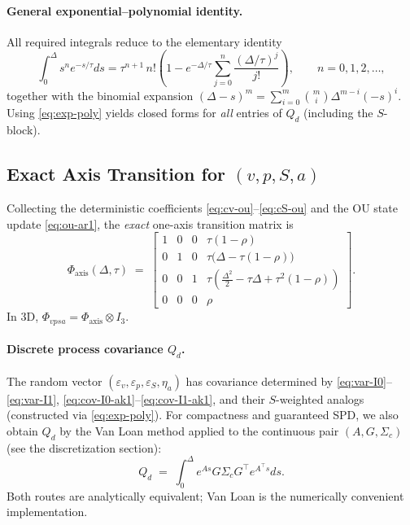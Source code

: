 \documentclass[11pt]{article}
\begin{document}
\paragraph{General exponential--polynomial identity.}
All required integrals reduce to the elementary identity
\begin{equation}
\int_0^\Delta s^n e^{-s/\tau} ds
= \tau^{n+1}\,n!\left(1 - e^{-\Delta/\tau}\sum_{j=0}^{n}\frac{(\Delta/\tau)^j}{j!}\right),
\qquad n=0,1,2,\dots,
\label{eq:exp-poly}
\end{equation}
together with the binomial expansion $(\Delta-s)^m=\sum_{i=0}^m \binom{m}{i}\Delta^{m-i}(-s)^i$.
Using \eqref{eq:exp-poly} yields closed forms for \emph{all} entries of $Q_d$ (including the $S$-block).

\subsection{Exact Axis Transition for $(v,p,S,a)$}
Collecting the deterministic coefficients \eqref{eq:cv-ou}--\eqref{eq:cS-ou} and the OU state update \eqref{eq:ou-ar1},
the \emph{exact} one-axis transition matrix is
\begin{equation}
\Phi_{\text{axis}}(\Delta,\tau) \;=\;
\begin{bmatrix}
1 & 0 & 0 & \tau(1-\rho)\\
0 & 1 & 0 & \tau\big(\Delta - \tau(1-\rho)\big)\\
0 & 0 & 1 & \tau\left(\tfrac{\Delta^2}{2} - \tau\Delta + \tau^2(1-\rho)\right)\\
0 & 0 & 0 & \rho
\end{bmatrix}.
\label{eq:Phi-axis-ou}
\end{equation}
In 3D, $\Phi_{vpsa}=\Phi_{\text{axis}}\otimes I_3$.

\paragraph{Discrete process covariance $Q_d$.}
The random vector $(\varepsilon_v,\varepsilon_p,\varepsilon_S,\eta_a)$ has covariance determined by
\eqref{eq:var-I0}--\eqref{eq:var-I1}, \eqref{eq:cov-I0-ak1}--\eqref{eq:cov-I1-ak1}, and their $S$-weighted analogs
(constructed via \eqref{eq:exp-poly}). For compactness and guaranteed SPD, we also obtain $Q_d$
by the Van Loan method applied to the continuous pair $(A,G,\Sigma_c)$ (see the discretization section):
\[
Q_d \;=\; \int_0^\Delta e^{A s} G \Sigma_c G^\top e^{A^\top s} ds.
\]
Both routes are analytically equivalent; Van Loan is the numerically convenient implementation.
\end{document}
